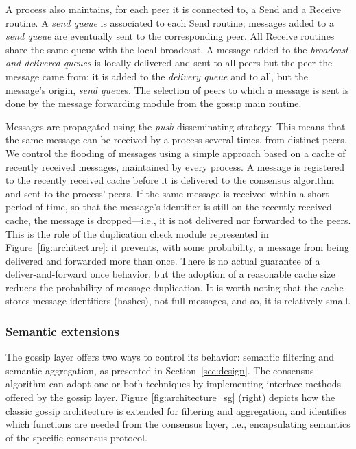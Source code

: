 A process also maintains, for each peer it is connected to, a Send and a
Receive routine. A {\em send queue} is associated to each Send routine; messages added to a {\em send queue} are eventually sent to the corresponding peer.
All Receive routines share the same queue with the local broadcast.  
%
A message added to the {\em broadcast and delivered queues} is locally delivered and sent to
all peers but the peer the message came from: it is added to the {\em delivery
queue} and to all, but the message's origin, {\em send queue}s.
%
The selection of peers to which a message is sent is done by the message
forwarding module from the gossip main routine.    

Messages are propagated using the {\em push} disseminating strategy. 
This means that the same message can be received by a
process several times, from distinct peers.
%
We control the flooding of messages using a simple approach based on a cache of recently received messages, maintained by every process.
%
A message is registered to the recently received cache before it is delivered
to the consensus algorithm and sent to the process' peers.
If the same message is received within a short period of time, so that the message's
identifier is still on the recently received cache, the message is
dropped---i.e., it is not delivered nor forwarded to the peers.
%
This is the role of the duplication check module represented in
Figure~\ref{fig:architecture}: it prevents, with some probability, a message
from being delivered and forwarded more than once. 
%
There is no actual guarantee of a deliver-and-forward once behavior, but the
adoption of a reasonable cache size reduces the probability
of message duplication.
%
It is worth noting that the cache stores message identifiers (hashes), not full messages, and so, it is relatively small.

\subsubsection{Semantic extensions}

The gossip layer offers two ways to control its behavior: semantic filtering and semantic aggregation, as presented in Section~\ref{sec:design}.
The consensus algorithm can adopt one or both techniques by implementing interface methods offered by the gossip layer.   
Figure \ref{fig:architecture_sg} (right) depicts how the classic gossip architecture is extended for filtering and aggregation, and identifies which functions are needed from the consensus layer, i.e., encapsulating semantics of the specific consensus protocol.

